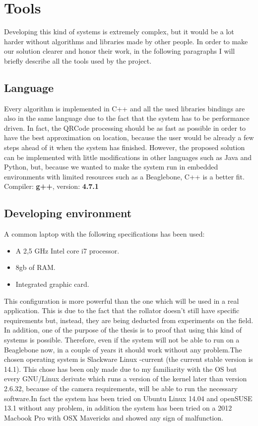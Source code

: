 \chapter{Tools}
Developing this kind of systems is extremely complex, but it would be a lot harder without algorithms and libraries made by other people.
In order to make our solution clearer and honor their work, in the following paragraphs I will briefly describe all the tools used by the project.

\section{Language}
Every algorithm is implemented in C++ and all the used libraries bindings are also in the same language due to the fact that the system has to be performance driven. In fact, the QRCode processing should be as fast as possible in order to have the best approximation on location, because the user would be already a few steps ahead of it when the system has finished. However, the proposed solution can be implemented with little modifications in other languages such as Java and Python, but, because we wanted to make the system run in embedded environments with limited resources such as a Beaglebone, C++ is a better fit.
\newline Compiler: \textbf{g++},  version: \textbf{4.7.1}


\section{Developing environment}
A common laptop with the following specifications has been used:
\begin{itemize}
  \item A 2,5 GHz Intel core i7 processor.
  \item 8gb of RAM.
  \item Integrated graphic card.
\end{itemize}
This configuration is more powerful than the one which will be used in a real application. This is due to the fact that the rollator doesn't still have specific requirements but, instead, they are being deducted from experiments on the field. In addition, one of the purpose of the thesis is to proof that using this kind of systems is possible. Therefore, even if the system will not be able to run on a Beaglebone now, in a couple of years it should work without any problem.The chosen operating system is Slackware Linux -current (the current stable version is 14.1). This chose has been only made due to my familiarity with the OS but every GNU/Linux derivate which runs a version of the kernel later than version 2.6.32, because of the camera requirements, will be able to run the necessary software.In fact the system has been tried on Ubuntu Linux 14.04 and openSUSE 13.1 without any problem, in addition the system has been tried on a 2012 Macbook Pro with OSX Mavericks and showed any sign of malfunction. 

